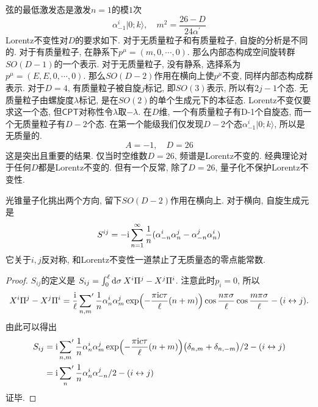 弦的最低激发态是激发$n=1$的模$1$次
\begin{equation}
\alpha_{-1}^{i}|0 ; k\rangle, \quad m^{2}=\frac{26-D}{24 \alpha^{\prime}}
\end{equation}
Lorentz不变性对$D$的要求如下. 对于无质量粒子和有质量粒子, 自旋的分析是不同的. 对于有质量粒子, 在静系下$p^\mu=(m,0,\cdots,0)$. 那么内部态构成空间旋转群$SO(D-1)$的一个表示. 对于无质量粒子, 没有静系, 选择系为$p^\mu=(E,E,0,\cdots,0)$. 那么$SO(D-2)$作用在横向上使$p^\mu$不变, 同样内部态构成群表示. 对于$D=4$, 有质量粒子被自旋$j$标记, 即$SO(3)$表示, 所以有$2j-1$个态. 无质量粒子由螺旋度$\lambda$标记, 是在$SO(2)$的单个生成元下的本征态. Lorentz不变仅要求这一个态, 但$\mathsf{CPT}$对称性令$\lambda$取$-\lambda$. 
在$D$维, 一个有质量粒子有D-1个自旋态, 而一个无质量粒子有$D-2$个态. 在第一个能级我们仅发现$D-2$个态$\alpha_{-1}^{i}|0 ; k\rangle$, 所以是无质量的. 
\begin{equation}
A=-1,\quad D=26
\end{equation}
这是突出且重要的结果. 仅当时空维数$D=26$, 频谱是Lorentz不变的. 经典理论对于任何$D$都是Lorentz不变的. 但有一个反常, 除了$D=26$, 量子化不保护Lorentz不变性.

光锥量子化挑出两个方向, 留下$SO(D-2)$作用在横向上. 
对于横向, 自旋生成元是
\begin{equation}
S^{i j}=-\mathrm{i} \sum_{n=1}^{\infty} \frac{1}{n}(\alpha_{-n}^{i} \alpha_{n}^{j}-\alpha_{-n}^{j} \alpha_{n}^{i})
\end{equation}
它关于$i,j$反对称, 和Lorentz不变性一道禁止了无质量态的零点能常数. 
\begin{proof}
$S_{ij}$的定义是 $S_{ij}= \int_{0}^{\ell}\mathrm{d}\sigma\: X^{i}\Pi^{j}-X^{j}\Pi^{i}$. 注意此时$p_{i}=0$, 所以
\begin{equation*}
    X^{i} \Pi^{j}-X^{j}\Pi^{i}=\frac{\mathrm{i}}{\ell} \sideset{}{'}\sum_{n, m} \frac{1}{n} \alpha_{n}^{i} \alpha_{m}^{j} \exp \Bigl(-\frac{\pi \mathrm{i} c \tau}{\ell}(n+m)\Bigr) \cos \frac{n \pi \sigma}{\ell} \cos \frac{m \pi \sigma}{\ell} -(i\leftrightarrow j).
\end{equation*}
由此可以得出
\begin{align*}
    S_{ij}&=\mathrm{i}\sideset{}{'}\sum_{n, m} \frac{1}{n} \alpha_{n}^{i} \alpha_{m}^{j} \exp \Bigl(-\frac{\pi \mathrm{i} c \tau}{\ell}(n+m)\Bigr)\bigl(\delta_{n,m}+\delta_{n,-m}\bigr)/2-(i\leftrightarrow j) \\
    &=\mathrm{i}\sideset{}{'}\sum_{n} \frac{1}{n} \alpha_{n}^{i} \alpha_{-n}^{j}/2-(i\leftrightarrow j) 
\end{align*}
证毕.
\end{proof}

